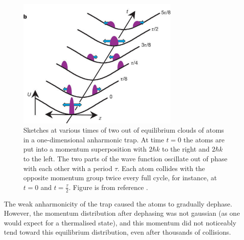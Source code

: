 \documentclass[a4paper, 10pt, draft]{article}
\theoremstyle{plain}
\begin{document}
\begin{figure}[H]
    \begin{center}
    \includegraphics[width=8cm]{quantum_newtons_cradle}
    \end{center}
    \caption{Sketches at various times of two out of equilibrium clouds of atoms
             in a one-dimensional anharmonic trap. At time $t=0$ the atoms are
             put into a momentum superposition with $2\hbar k$ to the right and
             $2 \hbar k$ to the left. The two parts of the wave function
             oscillate out of phase with each other with a period $\tau$. Each
             atom collides with the opposite momentum group twice every full
             cycle, for instance, at $t=0$ and $t = \frac{\tau}{2}$. Figure is
             from reference \cite{Kinoshita2006}.}
 \end{figure}

The weak anharmonicity of the trap caused the atoms to gradually dephase.
However, the momentum distribution after dephasing was not gaussian (as one
would expect for a thermalised state), and this momentum did not noticeably
tend toward this equilibrium distribution, even after thousands of collisions.
\end{document}
